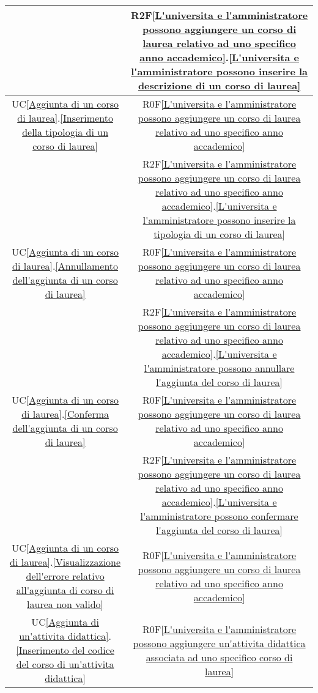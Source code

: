 \begin{longtable}{|c|c|}
& R2F\ref{L'universita e l'amministratore possono aggiungere un corso di laurea relativo ad uno specifico anno accademico}.\ref{L'universita e l'amministratore possono inserire la descrizione di un corso di laurea}\\
\hline
UC\ref{Aggiunta di un corso di laurea}.\ref{Inserimento della tipologia di un corso di laurea} & R0F\ref{L'universita e l'amministratore possono aggiungere un corso di laurea relativo ad uno specifico anno accademico}\\
& R2F\ref{L'universita e l'amministratore possono aggiungere un corso di laurea relativo ad uno specifico anno accademico}.\ref{L'universita e l'amministratore possono inserire la tipologia di un corso di laurea}\\
\hline
UC\ref{Aggiunta di un corso di laurea}.\ref{Annullamento dell'aggiunta di un corso di laurea} & R0F\ref{L'universita e l'amministratore possono aggiungere un corso di laurea relativo ad uno specifico anno accademico}\\
& R2F\ref{L'universita e l'amministratore possono aggiungere un corso di laurea relativo ad uno specifico anno accademico}.\ref{L'universita e l'amministratore possono annullare l'aggiunta del corso di laurea}\\
\hline
UC\ref{Aggiunta di un corso di laurea}.\ref{Conferma dell'aggiunta di un corso di laurea} & R0F\ref{L'universita e l'amministratore possono aggiungere un corso di laurea relativo ad uno specifico anno accademico}\\
& R2F\ref{L'universita e l'amministratore possono aggiungere un corso di laurea relativo ad uno specifico anno accademico}.\ref{L'universita e l'amministratore possono confermare l'aggiunta del corso di laurea}\\
\hline
UC\ref{Aggiunta di un corso di laurea}.\ref{Visualizzazione dell'errore relativo all'aggiunta di corso di laurea non valido} & R0F\ref{L'universita e l'amministratore possono aggiungere un corso di laurea relativo ad uno specifico anno accademico}\\
\hline
UC\ref{Aggiunta di un'attivita didattica}.\ref{Inserimento del codice del corso di un'attivita didattica} & R0F\ref{L'universita e l'amministratore possono aggiungere un'attivita didattica associata ad uno specifico corso di laurea}\\

\end{longtable}
